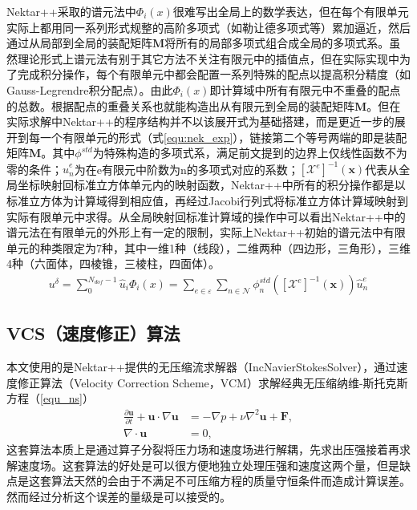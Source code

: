 Nektar++采取的谱元法中$\Phi_{i}(x)$很难写出全局上的数学表达，但在每个有限单元实际上都用同一系列形式规整的高阶多项式（如勒让德多项式等）累加逼近，然后通过从局部到全局的装配矩阵$\bm M$将所有的局部多项式组合成全局的多项式系。虽然理论形式上谱元法有别于其它方法不关注有限元中的插值点，但在实际实现中为了完成积分操作，每个有限单元中都会配置一系列特殊的配点以提高积分精度（如Gauss-Legrendre积分配点）。由此$\Phi_{i}(x)$即计算域中所有有限元中不重叠的配点的总数。根据配点的重叠关系也就能构造出从有限元到全局的装配矩阵$\bm M$。但在实际求解中Nektar++的程序结构并不以该展开式为基础搭建，而是更近一步的展开到每一个有限单元的形式（式\ref{equ:nek_exp}），链接第二个等号两端的即是装配矩阵$\bm M$。其中$\phi^{std}$为特殊构造的多项式系，满足前文提到的边界上仅线性函数不为零的条件；$\hat{u}^{e}_{n}$为在e有限元中阶数为n的多项式对应的系数；$[\mathcal{X}^{e}]^{-1}(\bm x)$代表从全局坐标映射回标准立方体单元内的映射函数，Nektar++中所有的积分操作都是以标准立方体为计算域得到相应值，再经过Jacobi行列式将标准立方体计算域映射到实际有限单元中求得。从全局映射回标准计算域的操作中可以看出Nektar++中的谱元法在有限单元的外形上有一定的限制，实际上Nektar++初始的谱元法中有限单元的种类限定为7种，其中一维1种（线段），二维两种（四边形，三角形），三维4种（六面体，四棱锥，三棱柱，四面体）。
\begin{equation}
\begin{aligned}
	u^{\delta} = \sum_{0}^{N_{dof}-1}\hat{u}_{i}\Phi_{i}(x) = \sum_{e\in\varepsilon}\sum_{n\in\mathcal{N}}\phi^{std}_{n}([\mathcal{X}^{e}]^{-1}(\bm x))\hat{u}^{e}_{n}
\end{aligned}
\label{equ:nek_exp}
\end{equation}
\subsection{VCS（速度修正）算法}
本文使用的是Nektar++提供的无压缩流求解器（IncNavierStokesSolver），通过速度修正算法（Velocity Correction Scheme，VCM）求解经典无压缩纳维-斯托克斯方程（\ref{equ_ns}）
\begin{equation}
    \begin{aligned}
\frac{\partial \boldsymbol{u}}{\partial t} + \boldsymbol{u}\cdot \nabla\boldsymbol{u} &= -\nabla p + \nu \nabla^2 \boldsymbol{u} + \boldsymbol{F}, \\
\nabla\cdot \boldsymbol{u} &= 0,
\end{aligned}
\label{equ_ns}
\end{equation}
这套算法本质上是通过算子分裂将压力场和速度场进行解耦，先求出压强接着再求解速度场。这套算法的好处是可以很方便地独立处理压强和速度这两个量，但是缺点是这套算法天然的会由于不满足不可压缩方程的质量守恒条件而造成计算误差。然而经过分析这个误差的量级是可以接受的。


